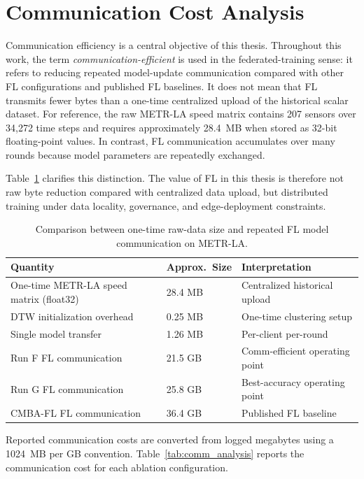\section{Communication Cost Analysis}
\label{sec:comm_analysis}
Communication efficiency is a central objective of this thesis. Throughout this work, the term \textit{communication-efficient} is used in the federated-training sense: it refers to reducing repeated model-update communication compared with other FL configurations and published FL baselines. It does not mean that FL transmits fewer bytes than a one-time centralized upload of the historical scalar dataset. For reference, the raw METR-LA speed matrix contains 207 sensors over 34{,}272 time steps and requires approximately 28.4~MB when stored as 32-bit floating-point values. In contrast, FL communication accumulates over many rounds because model parameters are repeatedly exchanged.

Table~\ref{tab:raw_vs_fl_comm} clarifies this distinction. The value of FL in this thesis is therefore not raw byte reduction compared with centralized data upload, but distributed training under data locality, governance, and edge-deployment constraints.

\begin{table}[htbp]
\centering
\caption{Comparison between one-time raw-data size and repeated FL model communication on METR-LA.}
\label{tab:raw_vs_fl_comm}
\begin{tabular}{l l l}
\hline
\textbf{Quantity} & \textbf{Approx.\ Size} & \textbf{Interpretation} \\
\hline
One-time METR-LA speed matrix (float32) & 28.4 MB & Centralized historical upload \\
DTW initialization overhead & 0.25 MB & One-time clustering setup \\
Single model transfer & 1.26 MB & Per-client per-round \\
Run F FL communication & 21.5 GB & Comm-efficient operating point \\
Run G FL communication & 25.8 GB & Best-accuracy operating point \\
CMBA-FL FL communication & 36.4 GB & Published FL baseline \\
\hline
\end{tabular}
\end{table}

Reported communication costs are converted from logged megabytes using a 1024~MB per GB convention. Table~\ref{tab:comm_analysis} reports the communication cost for each ablation configuration.

